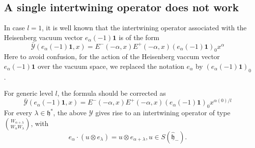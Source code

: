 \documentclass[11pt,oneside,reqno]{amsart}
\theoremstyle{definition}
\newcommand{\h}{{\mathfrak h}}
\newcommand{\Y}{{\mathcal Y}}
\newcommand{\one}{\mathbf{1}}
\begin{document}
\subsection{A single intertwining operator does not work}
In case $l=1$, it is well known that the intertwining operator associated with the Heisenberg vacuum vector $e_\alpha(-1)\one$ is of the form 
$$\bar{\Y}(e_\alpha(-1)\one, x) = E^-(-\alpha, x)E^+(-\alpha, x) (e_\alpha(-1)\one)_0 x^{\alpha}$$
Here to avoid confusion, for the action of the Heisenberg vaccum vector $e_\alpha(-1)\one$ over the vacuum space, we replaced the notation $e_\alpha$ by $(e_\alpha(-1)\one)_0$. 

For generic level $l$, the formula should be corrected as
$$\bar{\Y}(e_\alpha(-1)\one, x) = E^-(-\alpha, x)E^+(-\alpha, x) (e_\alpha(-1)\one)_0 x^{\alpha(0)/l}$$
For every $\lambda\in \h^*$, the above $\Y$ gives rise to an intertwining operator of type $\binom{W_{\alpha+\lambda}}{W_\alpha W_\lambda}$, with  
$$e_\alpha \cdot (u\otimes e_\lambda) = u\otimes e_{\alpha+\lambda}, u\in S(\hat\h_-).$$
\end{document}
